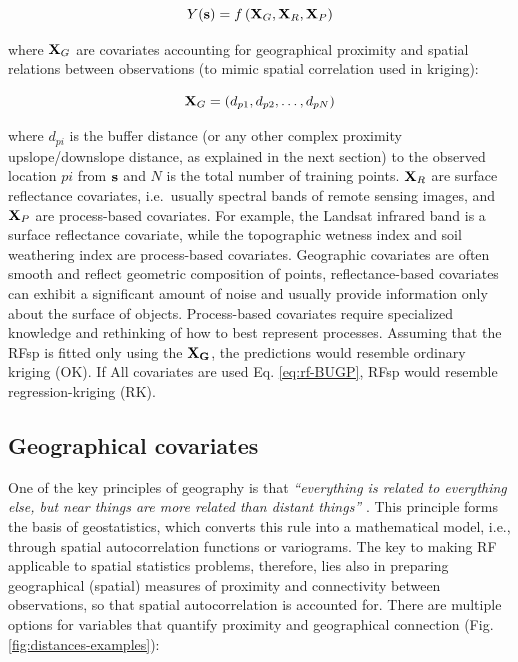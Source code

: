 \documentclass[graybox,natbib,nospthms,UStrade]{svmono}
\begin{document}
\begin{equation}
Y({{\bf s}}) = f \left( {{\bf X}_G}, {{\bf X}_R}, {{\bf X}_P} \right)
\label{eq:rf-BUGP}
\end{equation}

where \({{\bf X}_G}\) are covariates accounting for geographical proximity
and spatial relations between observations (to mimic spatial correlation
used in kriging):

\begin{equation}
{{\bf X}_G} = \left( d_{p1}, d_{p2}, \ldots , d_{pN} \right)
\end{equation}

where \(d_{pi}\) is the buffer distance (or any other complex proximity
upslope/downslope distance, as explained in the next section) to the
observed location \(pi\) from \({\bf s}\) and \(N\) is the total number of
training points. \({{\bf X}_R}\) are surface reflectance covariates,
i.e.~usually spectral bands of remote sensing images, and \({{\bf X}_P}\) are
process-based covariates. For example, the Landsat infrared band is a
surface reflectance covariate, while the topographic wetness index and
soil weathering index are process-based covariates. Geographic
covariates are often smooth and reflect geometric composition of points,
reflectance-based covariates can exhibit a significant amount of noise and
usually provide information only about the surface of objects. Process-based
covariates require specialized knowledge and rethinking of how to
best represent processes. Assuming that the RFsp is fitted only using the
\({\bf {X}_G}\), the predictions would resemble ordinary kriging (OK). If All covariates are
used Eq. \eqref{eq:rf-BUGP}, RFsp would resemble regression-kriging (RK).

\hypertarget{geographical-covariates}{%
\subsection{Geographical covariates}\label{geographical-covariates}}

One of the key principles of geography is that \emph{``everything is related
to everything else, but near things are more related than distant
things''} \citep{miller2004tobler}. This principle forms the basis of
geostatistics, which converts this rule into a mathematical model, i.e.,
through spatial autocorrelation functions or variograms. The key to
making RF applicable to spatial statistics problems, therefore, lies also in
preparing geographical (spatial) measures of proximity and connectivity between
observations, so that spatial autocorrelation is accounted for. There
are multiple options for variables that quantify proximity and geographical
connection (Fig. \ref{fig:distances-examples}):
\end{document}
